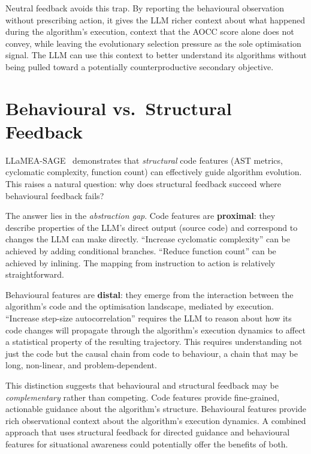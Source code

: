 Neutral feedback avoids this trap. By reporting the behavioural observation without prescribing action, it gives the LLM richer context about what happened during the algorithm's execution, context that the AOCC score alone does not convey, while leaving the evolutionary selection pressure as the sole optimisation signal. The LLM can use this context to better understand its algorithms without being pulled toward a potentially counterproductive secondary objective.

\section{Behavioural vs.\ Structural Feedback}
\label{sec:disc-structural}

LLaMEA-SAGE~\cite{vanStein2026LLaMEASAGE} demonstrates that \emph{structural} code features (AST metrics, cyclomatic complexity, function count) can effectively guide algorithm evolution. This raises a natural question: why does structural feedback succeed where behavioural feedback fails?

The answer lies in the \emph{abstraction gap}. Code features are \textbf{proximal}: they describe properties of the LLM's direct output (source code) and correspond to changes the LLM can make directly. ``Increase cyclomatic complexity'' can be achieved by adding conditional branches. ``Reduce function count'' can be achieved by inlining. The mapping from instruction to action is relatively straightforward.

Behavioural features are \textbf{distal}: they emerge from the interaction between the algorithm's code and the optimisation landscape, mediated by execution. ``Increase step-size autocorrelation'' requires the LLM to reason about how its code changes will propagate through the algorithm's execution dynamics to affect a statistical property of the resulting trajectory. This requires understanding not just the code but the causal chain from code to behaviour, a chain that may be long, non-linear, and problem-dependent.

This distinction suggests that behavioural and structural feedback may be \emph{complementary} rather than competing. Code features provide fine-grained, actionable guidance about the algorithm's structure. Behavioural features provide rich observational context about the algorithm's execution dynamics. A combined approach that uses structural feedback for directed guidance and behavioural features for situational awareness could potentially offer the benefits of both.

